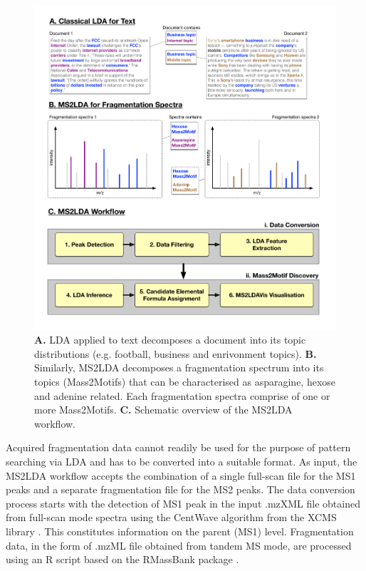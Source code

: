 \begin{figure}[!htbp]
\centering\includegraphics[width=1.0\linewidth]{07-lda/figures/text2frags_new.pdf}
\centering\caption[A comparison between classical LDA for text and MS2LDA for fragmentation spectra.]{\textbf{A.} LDA applied to text decomposes a document into its topic distributions (e.g. football, business and enrivonment topics). \textbf{B.} Similarly, MS2LDA decomposes a fragmentation spectrum into its topics (Mass2Motifs) that can be characterised as asparagine, hexose and adenine related. Each fragmentation spectra comprise of one or more Mass2Motifs. \textbf{C.} Schematic overview of the MS2LDA workflow.\label{fig:text2frags}}
\end{figure}

Acquired fragmentation data cannot readily be used for the purpose of pattern searching via LDA and has to be converted into a suitable format. As input, the MS2LDA workflow accepts the combination of a single full-scan file for the MS1 peaks and a separate fragmentation file for the MS2 peaks. The data conversion process starts with the detection of MS1 peak in the input .mzXML file obtained from full-scan mode spectra using the CentWave algorithm from the XCMS library \cite{Smith2006}. This constitutes information on the parent (MS1) level. Fragmentation data, in the form of .mzML file obtained from tandem MS mode, are processed using an R script based on the RMassBank package \cite{Stravs2013}. 

